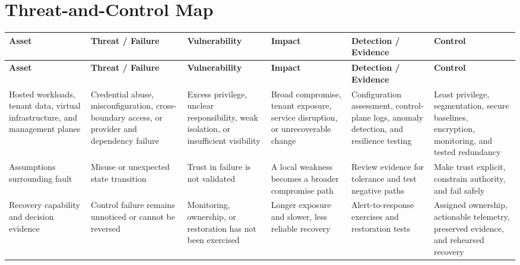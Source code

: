 \documentclass[11pt]{article}
\begin{document}
\section*{Threat-and-Control Map}
\begingroup\scriptsize\setlength{\tabcolsep}{2pt}
\begin{longtable}{>{\RaggedRight\arraybackslash}p{}>{\RaggedRight\arraybackslash}p{}>{\RaggedRight\arraybackslash}p{}>{\RaggedRight\arraybackslash}p{}>{\RaggedRight\arraybackslash}p{}>{\RaggedRight\arraybackslash}p{}}
\toprule\rowcolor{Navy}\color{white}\textbf{Asset} & \color{white}\textbf{Threat / Failure} & \color{white}\textbf{Vulnerability} & \color{white}\textbf{Impact} & \color{white}\textbf{Detection / Evidence} & \color{white}\textbf{Control}\\\midrule
\endfirsthead
\toprule\rowcolor{Navy}\color{white}\textbf{Asset} & \color{white}\textbf{Threat / Failure} & \color{white}\textbf{Vulnerability} & \color{white}\textbf{Impact} & \color{white}\textbf{Detection / Evidence} & \color{white}\textbf{Control}\\\midrule
\endhead
Hosted workloads, tenant data, virtual infrastructure, and management planes & Credential abuse, misconfiguration, cross-boundary access, or provider and dependency failure & Excess privilege, unclear responsibility, weak isolation, or insufficient visibility & Broad compromise, tenant exposure, service disruption, or unrecoverable change & Configuration assessment, control-plane logs, anomaly detection, and resilience testing & Least privilege, segmentation, secure baselines, encryption, monitoring, and tested redundancy\\\midrule
Assumptions surrounding fault & Misuse or unexpected state transition & Trust in failure is not validated & A local weakness becomes a broader compromise path & Review evidence for tolerance and test negative paths & Make trust explicit, constrain authority, and fail safely\\\midrule
Recovery capability and decision evidence & Control failure remains unnoticed or cannot be reversed & Monitoring, ownership, or restoration has not been exercised & Longer exposure and slower, less reliable recovery & Alert-to-response exercises and restoration tests & Assigned ownership, actionable telemetry, preserved evidence, and rehearsed recovery\\\midrule
\bottomrule
\end{longtable}
\endgroup
\end{document}
